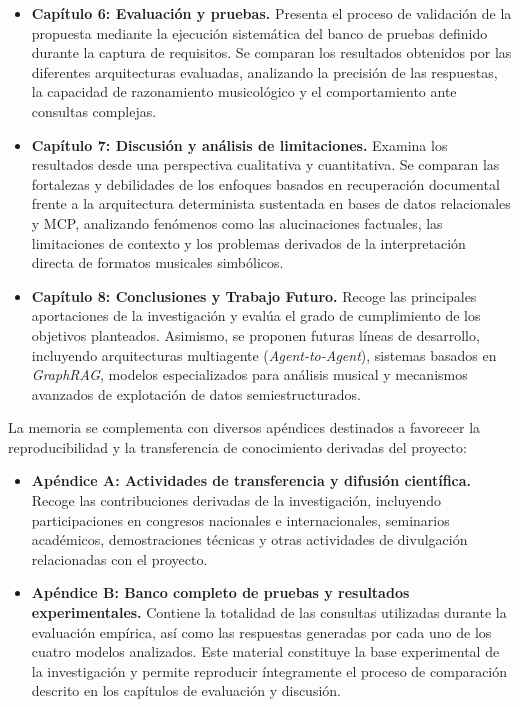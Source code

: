 \begin{itemize}
    \item \textbf{Capítulo 6: Evaluación y pruebas.} Presenta el proceso de validación de la propuesta mediante la ejecución sistemática del banco de pruebas definido durante la captura de requisitos. Se comparan los resultados obtenidos por las diferentes arquitecturas evaluadas, analizando la precisión de las respuestas, la capacidad de razonamiento musicológico y el comportamiento ante consultas complejas.
    \item \textbf{Capítulo 7: Discusión y análisis de limitaciones.} Examina los resultados desde una perspectiva cualitativa y cuantitativa. Se comparan las fortalezas y debilidades de los enfoques basados en recuperación documental frente a la arquitectura determinista sustentada en bases de datos relacionales y MCP, analizando fenómenos como las alucinaciones factuales, las limitaciones de contexto y los problemas derivados de la interpretación directa de formatos musicales simbólicos.
    \item \textbf{Capítulo 8: Conclusiones y Trabajo Futuro.} Recoge las principales aportaciones de la investigación y evalúa el grado de cumplimiento de los objetivos planteados. Asimismo, se proponen futuras líneas de desarrollo, incluyendo arquitecturas multiagente (\textit{Agent-to-Agent}), sistemas basados en \textit{GraphRAG}, modelos especializados para análisis musical y mecanismos avanzados de explotación de datos semiestructurados.
\end{itemize}

La memoria se complementa con diversos apéndices destinados a favorecer la reproducibilidad y la transferencia de conocimiento derivadas del proyecto:

\begin{itemize}

\item \textbf{Apéndice A: Actividades de transferencia y difusión científica.} Recoge las contribuciones derivadas de la investigación, incluyendo participaciones en congresos nacionales e internacionales, seminarios académicos, demostraciones técnicas y otras actividades de divulgación relacionadas con el proyecto.

\item \textbf{Apéndice B: Banco completo de pruebas y resultados experimentales.} Contiene la totalidad de las consultas utilizadas durante la evaluación empírica, así como las respuestas generadas por cada uno de los cuatro modelos analizados. Este material constituye la base experimental de la investigación y permite reproducir íntegramente el proceso de comparación descrito en los capítulos de evaluación y discusión.

\end{itemize}

